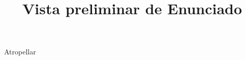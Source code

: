 \documentclass[a4paper,12pt]{article}\usepackage[utf8]{inputenc}\usepackage[spanish]{babel}\usepackage{times}
\title{Vista preliminar de Enunciado}
\begin{document}
\twocolumn 

\maketitle

Atropellar
\end{document}
